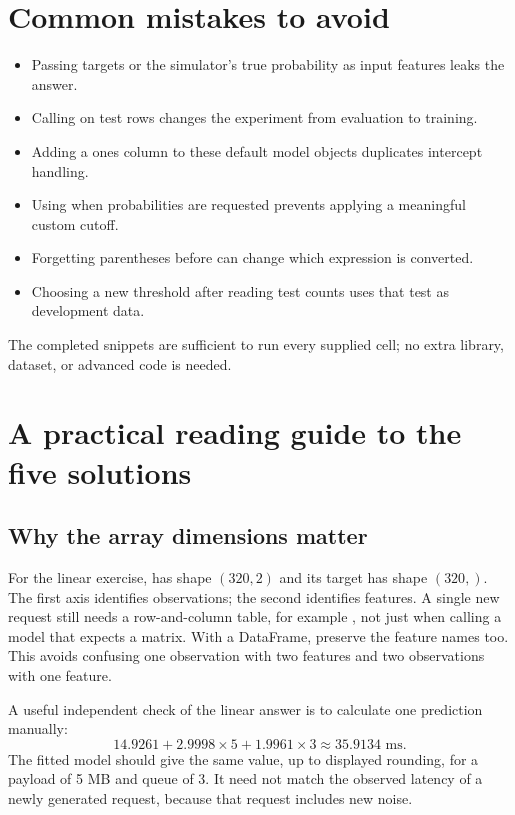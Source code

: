 \section*{Common mistakes to avoid}
\begin{itemize}
\item Passing targets or the simulator's true probability as input features leaks the answer.
\item Calling  on test rows changes the experiment from evaluation to training.
\item Adding a ones column to these default model objects duplicates intercept handling.
\item Using  when probabilities are requested prevents applying a meaningful custom cutoff.
\item Forgetting parentheses before  can change which expression is converted.
\item Choosing a new threshold after reading test counts uses that test as development data.
\end{itemize}
The completed snippets are sufficient to run every supplied cell; no extra library, dataset, or advanced code is needed.

\section*{A practical reading guide to the five solutions}
\subsection*{Why the array dimensions matter}
For the linear exercise,  has shape $(320,2)$ and its target has shape $(320,)$.
The first axis identifies observations; the second identifies features. A single new request still needs a
row-and-column table, for example \code{[[5.0, 3.0]]}, not just \code{[5.0, 3.0]} when calling a model that expects a matrix.
With a DataFrame, preserve the feature names too. This avoids confusing one observation with two features and
two observations with one feature.

A useful independent check of the linear answer is to calculate one prediction manually:
\[14.9261+2.9998\times5+1.9961\times3\approx35.9134\text{ ms}.\]
The fitted model should give the same value, up to displayed rounding, for a payload of 5 MB and queue of 3.
It need not match the observed latency of a newly generated request, because that request includes new noise.

